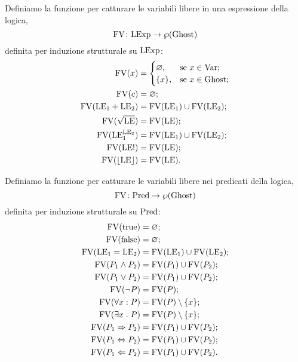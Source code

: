 \begin{definizione} 
Definiamo la funzione per catturare le variabili libere in una espressione della logica,
\[
  \mathord{\mathrm{FV}}\colon\mathrm{LExp}\to\wp(\mathrm{Ghost})
\]
definita per induzione strutturale su $\mathrm{LExp}$:
\begin{align*}
   \mathrm{FV}(x)
      &=
        \begin{cases}
            \varnothing,&\text{se $x  \in \mathrm{Var}$};\\
            \{x\},    &\text{se $x  \in \mathrm{Ghost}$};
        \end{cases} \\
   \mathrm{FV}(c)
      &= \varnothing;\\
   \mathrm{FV}(\mathrm{LE}_1 + \mathrm{LE}_2)
      &= \mathrm{FV}(\mathrm{LE}_1) \cup \mathrm{FV}(\mathrm{LE}_2);\\
   \mathrm{FV}(\sqrt{\mathrm{LE}})
      &= \mathrm{FV}(\mathrm{LE});\\
   \mathrm{FV}(\mathrm{LE}_1^{\mathrm{LE}_2})
      &= \mathrm{FV}(\mathrm{LE}_1) \cup \mathrm{FV}(\mathrm{LE}_2);\\
   \mathrm{FV}(\mathrm{LE}!)
      &= \mathrm{FV}(\mathrm{LE});\\
   \mathrm{FV}(\lfloor \mathrm{LE} \rfloor)
      &= \mathrm{FV}(\mathrm{LE}).
\end{align*}
\end{definizione}

\begin{definizione} 
Definiamo la funzione per catturare
le variabili libere nei predicati della logica,
\[
  \mathord{\mathrm{FV}}\colon\mathrm{Pred}\to\wp(\mathrm{Ghost})
\]
definita per induzione strutturale su $\mathrm{Pred}$:
\begin{align*}
   \mathrm{FV}(\mathrm{true})
      &= \varnothing;\\
   \mathrm{FV}(\mathrm{false})
      &= \varnothing;\\
   \mathrm{FV}(\mathrm{LE}_1 = \mathrm{LE}_2)
      &= \mathrm{FV}(\mathrm{LE}_1) \cup \mathrm{FV}(\mathrm{LE}_2);\\
   \mathrm{FV}(P_1 \land P_2)
      &= \mathrm{FV}(P_1) \cup \mathrm{FV}(P_2);\\
   \mathrm{FV}(P_1 \lor P_2)
      &= \mathrm{FV}(P_1) \cup \mathrm{FV}(P_2);\\
   \mathrm{FV}(\neg P)
      &= \mathrm{FV}(P);\\
   \mathrm{FV}(\forall x \mathrel{:} P)
      &= \mathrm{FV}(P)\setminus \{x\};\\
   \mathrm{FV}(\exists x \mathrel{.} P)
      &= \mathrm{FV}(P)\setminus \{x\};\\
   \mathrm{FV}(P_1 \Rightarrow P_2)
      &= \mathrm{FV}(P_1) \cup \mathrm{FV}(P_2);\\
   \mathrm{FV}(P_1 \Leftrightarrow P_2)
      &= \mathrm{FV}(P_1) \cup \mathrm{FV}(P_2);\\
   \mathrm{FV}(P_1 \Leftarrow P_2)
      &= \mathrm{FV}(P_1) \cup \mathrm{FV}(P_2).
\end{align*}
\end{definizione}

